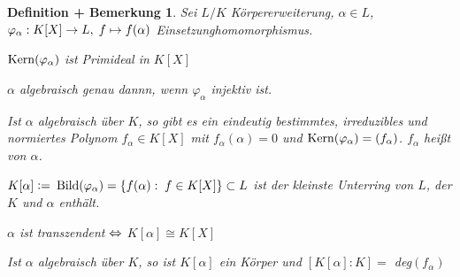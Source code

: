 \documentclass[a4paper,10pt,german]{scrbook}
\theoremstyle{saetze}
\theoremstyle{definitionen}
\newtheorem{DefBem}[Def]{Definition + Bemerkung}
\begin{document}
\begin{DefBem}
\label{minimalpolynome}
Sei $L/K$ Körpererweiterung,
$\alpha \in L$, $\\\varphi_\alpha: K[X] \rightarrow L,\;f\mapsto f(\alpha)$
Einsetzunghomomorphismus.
\begin{enum}
\item $\mathop{\rm Kern}\nolimits(\varphi_\alpha)$ ist Primideal in $K[X]$


\item $\alpha$ algebraisch genau dannn, wenn $\varphi_\alpha$ injektiv ist.

\item Ist $\alpha$ algebraisch über $K$, so gibt es ein eindeutig
bestimmtes, irreduzibles und normiertes Polynom $f_\alpha \in K[X]$
mit $f_\alpha(\alpha) = 0$ und $\mathop{\rm Kern}\nolimits(\varphi_\alpha) = (f_\alpha)$.
\newline $f_\alpha$ heißt  von $\alpha$.


\item $K[\alpha] \mathrel{\mathop:}=$ $\mathop{\rm Bild}\nolimits(\varphi_\alpha) = \{f(\alpha):\;f
\in K[X]\} \subset L$ ist der kleinste Unterring von $L$, der $K$
und $\alpha$ enthält.

\item $\alpha$ ist transzendent $\Leftrightarrow$ $K[\alpha] \cong K[X]$


\item Ist $\alpha$ algebraisch über $K$, so ist $K[\alpha]$ ein
Körper und $[K[\alpha]:K] =$ deg$(f_\alpha)$


\end{enum}
\end{DefBem}
\end{document}
